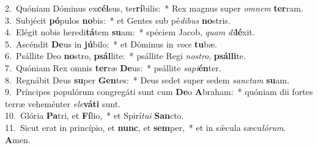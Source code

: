 {2.~}Quóniam Dóminus ex\textbf{cél}sus, ter\textbf{rí}bilis:~* Rex magnus super \textit{om}\textit{nem} \textbf{ter}ram.\\
{3.~}Subjécit \textbf{pó}pulos \textbf{no}bis:~* et Gentes sub pé\textit{di}\textit{bus} \textbf{no}stris.\\
{4.~}Elégit nobis heredi\textbf{tá}tem \textbf{su}am:~* spéciem Jacob, \textit{quam} \textit{di}\textbf{lé}xit.\\
{5.~}Ascéndit \textbf{De}us in \textbf{jú}bilo:~* et Dóminus in \textit{vo}\textit{ce} \textbf{tu}bæ.\\
{6.~}Psállite Deo \textbf{no}stro, \textbf{psál}lite:~* psállite Regi \textit{no}\textit{stro}, \textbf{psál}\textbf{li}te.\\
{7.~}Quóniam Rex omnis \textbf{ter}ræ \textbf{De}us:~* psállite \textit{sa}\textit{pi}\textbf{én}ter.\\
{8.~}Regnábit Deus \textbf{su}per \textbf{Gen}tes:~* Deus sedet super sedem \textit{san}\textit{ctam} \textbf{su}am.\\
{9.~}Príncipes populórum congregáti sunt cum \textbf{De}o \textbf{A}braham:~* quóniam dii fortes terræ veheménter \textit{e}\textit{le}\textbf{vá}\textbf{ti} sunt.\\
{10.~}Glória \textbf{Pa}tri, et \textbf{Fí}lio,~* et Spirí\textit{tu}\textit{i} \textbf{San}cto.\\
{11.~}Sicut erat in princípio, et \textbf{nunc}, et \textbf{sem}per,~* et in sǽcula sæcu\textit{ló}\textit{rum}. \textbf{A}men.\\
